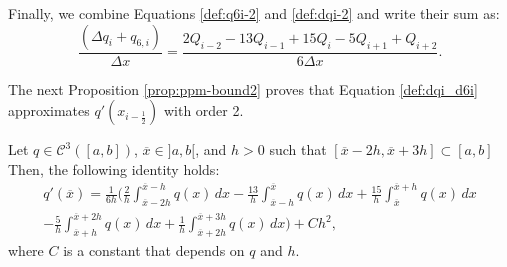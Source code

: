 Finally, we combine Equations \eqref{def:q6i-2} and \eqref{def:dqi-2} and write their sum as:
\begin{equation} 
	\label{def:dqi_d6i}
	\frac{(\Delta q_i + q_{6, i})}{\Delta x} = 
	\frac{2Q_{i-2}-13Q_{i-1} +15Q_i -5Q_{i+1} + Q_{i+2}}{6\Delta x}.
\end{equation}

The next Proposition \ref{prop:ppm-bound2} proves that Equation \eqref{def:dqi_d6i}
approximates $q'(x_{i-\frac{1}{2}})$ with order 2.
\begin{prop}
	\label{prop:ppm-bound2}
	Let $q \in \mathcal{C}^{3}([a,b])$, $\overline{x}\in ]a,b[$,
	and $h>0$ such that $[\overline{x}-2h,\overline{x}+3h] \subset [a,b]$
	Then, the following identity holds:
	\begin{equation}
		\begin{split}
		\label{prop:ppm-bound2-eq1}
		q'(\overline{x} ) = \frac{1}{6h}
		\bigg( \frac{2}{h} \int_{\overline{x}-2h}^{\overline{x}-h} q(x) \,dx 
		      -\frac{13}{h}\int_{\overline{x}-h}^{\overline{x}} q(x) \,dx   
		      +\frac{15}{h}\int_{\overline{x}}^{\overline{x}+h} q(x) \,dx  \\ 
		      -\frac{5}{h} \int_{\overline{x}+h}^{\overline{x}+2h} q(x) \,dx   
		      +\frac{1}{h} \int_{\overline{x}+2h}^{\overline{x}+3h} q(x) \,dx   
		\bigg) + Ch^2,
		\end{split}
	\end{equation}
	where $C$ is a constant that depends on $q$ and $h$.
\end{prop}

